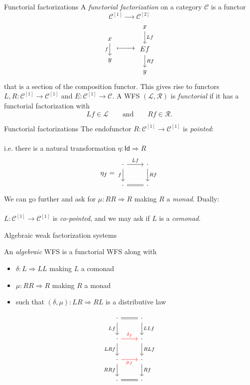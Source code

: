 \documentclass[compress]{beamer}
\newcommand{\varcat}[1]{\mathcal{#1}}
\newcommand{\C}{\varcat{C}}
\renewcommand{\L}{\mathcal{L}}
\newcommand{\R}{\mathcal{R}}
\newcommand{\To}{\Rightarrow}
\newcommand{\ii}{{\scriptscriptstyle [1]}}
\newcommand{\iii}{{\scriptscriptstyle [2]}}
\newcommand{\1}{\mathbf{1}}
\newcommand{\Id}{\mathsf{Id}}
\newcommand{\xto}[1]{\xrightarrow{#1}}
\begin{document}
\begin{frame}[fragile]{Functorial factorizations}
	A \emph{functorial factorization} on a category $\C$ is a functor
	\[
		\C^\ii \xto{\quad \quad} \C^\iii
	\]
	\[
		\begin{tikzcd}
			x \ar[d, "f"']
			\\
			y
		\end{tikzcd}
		\xmapsto{\quad \quad}
		\begin{tikzcd}
			x \ar[d, "Lf"]
			\\
			Ef \ar[d, "Rf"]
			\\
			y 
		\end{tikzcd}
	\]	
	that is a section of the composition functor.
	\pause \vfill
	This gives rise to functors $L, R \colon \C^\ii \to \C^\ii$ and $E \colon \C^\ii \to \C$.
	\pause \vfill
	A WFS $(\L, \R)$ is \emph{functorial} if it has a functorial factorization with
	\[
		Lf \in \L \quad \quad \text{and} \quad \quad Rf \in \R.
	\]
\end{frame}

\begin{frame}[fragile]{Functorial factorizations}
	The endofunctor $R \colon \C^\ii \to \C^\ii$ is \emph{pointed}: \\~\\
	\pause 
	i.e. there is a natural transformation $\eta \colon \Id \To R$
	\[
		\eta_f =
		\begin{tikzcd}
			\cdot \ar[d, "f"'] \ar[r, "Lf"] & \cdot \ar[d, "Rf"]
			\\
			\cdot \ar[r, equals] & \cdot
		\end{tikzcd}
	\]
	\pause
	We can go further and ask for $\mu \colon RR \To R$ making $R$ a \emph{monad}.
	\pause \vfill
	Dually: \\~\\

	$L \colon \C^\ii \to \C^\ii$ is \emph{co-pointed}, and we may ask if $L$ is a \emph{comonad}.
\end{frame}

\begin{frame}[fragile]{Algebraic weak factorization systems}
	\begin{definition}
		An \emph{algebraic} WFS is a functorial WFS along with
		\begin{itemize}
			\item $\delta \colon L \To LL$ making $L$ a comonad
			\item $\mu \colon RR \To R$ making $R$ a monad
			\item such that $(\delta, \mu) \colon LR \To RL$ is a distributive law
		\end{itemize}
	\end{definition}
		\[	
			\begin{tikzcd}
				\cdot \ar[r, equals] \ar[d, "Lf"'] & \cdot \ar[d, "LLf"]
				\\
				\cdot \ar[r, "\delta_f", red] \ar[d, "LRf"'] & \cdot \ar[d, "RLf"]
				\\
				\cdot \ar[r, "\mu_f"', red] \ar[d, "RRf"'] & \cdot \ar[d, "Rf"]
				\\
				\cdot \ar[r, equals] & \cdot
			\end{tikzcd}
		\]	
\end{frame}
\end{document}
